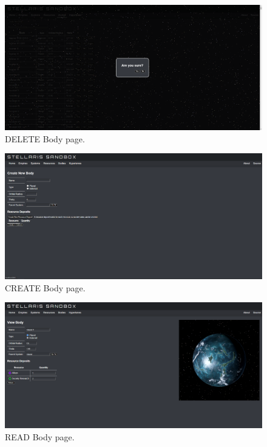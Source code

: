 \documentclass[12pt]{article}
\begin{document}
\begin{figure}[!ht]
  \caption{DELETE Body page.}
  \includegraphics[width=\textwidth]{screenshots/bodies/bodies_delete.png}
\end{figure}

\begin{figure}[!ht]
  \caption{CREATE Body page.}
  \includegraphics[width=\textwidth]{screenshots/bodies/bodies_create.png}
\end{figure}

\begin{figure}[!ht]
  \caption{READ Body page.}
  \includegraphics[width=\textwidth]{screenshots/bodies/bodies_read.png}
\end{figure}
\end{document}

